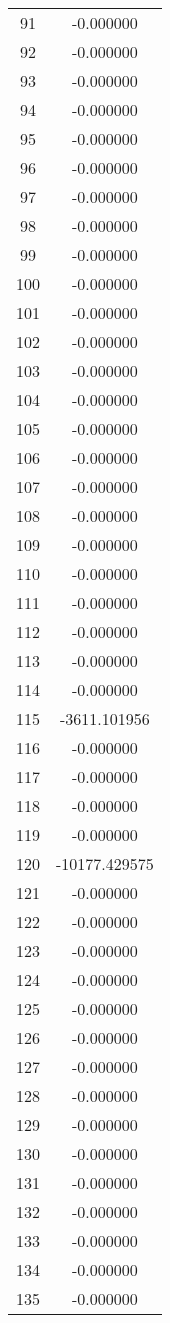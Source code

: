 \documentclass[12pt]{article}
\begin{document}
\begin{longtable}{@{}cc@{}}
91 & -0.000000 \\
92 & -0.000000 \\
93 & -0.000000 \\
94 & -0.000000 \\
95 & -0.000000 \\
96 & -0.000000 \\
97 & -0.000000 \\
98 & -0.000000 \\
99 & -0.000000 \\
100 & -0.000000 \\
101 & -0.000000 \\
102 & -0.000000 \\
103 & -0.000000 \\
104 & -0.000000 \\
105 & -0.000000 \\
106 & -0.000000 \\
107 & -0.000000 \\
108 & -0.000000 \\
109 & -0.000000 \\
110 & -0.000000 \\
111 & -0.000000 \\
112 & -0.000000 \\
113 & -0.000000 \\
114 & -0.000000 \\
115 & -3611.101956 \\
116 & -0.000000 \\
117 & -0.000000 \\
118 & -0.000000 \\
119 & -0.000000 \\
120 & -10177.429575 \\
121 & -0.000000 \\
122 & -0.000000 \\
123 & -0.000000 \\
124 & -0.000000 \\
125 & -0.000000 \\
126 & -0.000000 \\
127 & -0.000000 \\
128 & -0.000000 \\
129 & -0.000000 \\
130 & -0.000000 \\
131 & -0.000000 \\
132 & -0.000000 \\
133 & -0.000000 \\
134 & -0.000000 \\
135 & -0.000000 \\

\end{longtable}
\end{document}

